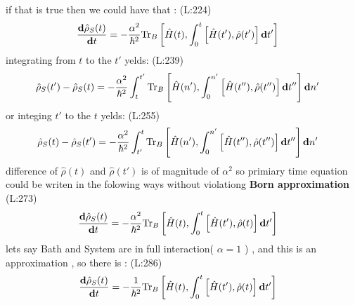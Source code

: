  if that is true then we could have that : 
(L:224)
\begin{equation}
\begin{split}
\label{defRhoSys}\dfrac{\bold{d}\hat{\rho }_{S }(t )}{\bold{d}t }&=-\dfrac{\alpha ^{2}}{\hbar ^{2}}\text{Tr}_{B }\left[\hat{H }(t ),\int _{0}^{t }\left[\hat{H }(t '),\hat{\rho }(t ')\right]\bold{d}t '\right]\end{split}
\end{equation}
 integrating  from 
 $ t  $  to the  
 $ t ' $ yelds: 
(L:239)
\begin{equation}
\begin{split}
\hat{\rho }_{S }(t ')-\hat{\rho }_{S }(t )&=-\dfrac{\alpha ^{2}}{\hbar ^{2}}\int _{t }^{t '}\text{Tr}_{B }\left[\hat{H }(n '),\int _{0}^{n '}\left[\hat{H }(t ''),\hat{\rho }(t '')\right]\bold{d}t ''\right]\bold{d}n '\end{split}
\end{equation}
 or integing
 $ t ' $  to the  
 $ t  $ yelds: 
(L:255)
\begin{equation}
\begin{split}
\hat{\rho }_{S }(t )-\hat{\rho }_{S }(t ')&=-\dfrac{\alpha ^{2}}{\hbar ^{2}}\int _{t '}^{t }\text{Tr}_{B }\left[\hat{H }(n '),\int _{0}^{n '}\left[\hat{H }(t ''),\hat{\rho }(t '')\right]\bold{d}t ''\right]\bold{d}n '\end{split}
\end{equation}
difference of 
 $ \hat{\rho }(t ) $  and  
 $ \hat{\rho }(t ') $  is of magnitude of 
 $ \alpha ^{2} $  so primiary time equation could be writen in the folowing 
 ways without violationg \textbf{Born approximation}
(L:273)
\begin{equation}
\begin{split}
\dfrac{\bold{d}\hat{\rho }_{S }(t )}{\bold{d}t }&=-\dfrac{\alpha ^{2}}{\hbar ^{2}}\text{Tr}_{B }\left[\hat{H }(t ),\int _{0}^{t }\left[\hat{H }(t '),\hat{\rho }(t )\right]\bold{d}t '\right]\end{split}
\end{equation}
 lets say Bath and System are in full interaction( 
 $ \alpha =1 $  )  , and this is an approximation , so there is : 
(L:286)
\begin{equation}
\begin{split}
\dfrac{\bold{d}\hat{\rho }_{S }(t )}{\bold{d}t }&=-\dfrac{1}{\hbar ^{2}}\text{Tr}_{B }\left[\hat{H }(t ),\int _{0}^{t }\left[\hat{H }(t '),\hat{\rho }(t )\right]\bold{d}t '\right]\end{split}
\end{equation}
